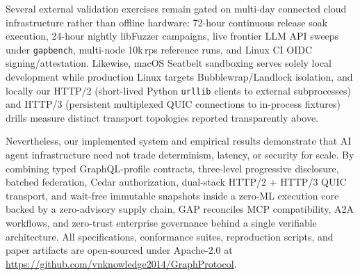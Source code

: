 \documentclass[10pt,twocolumn]{article}
\begin{document}
Several external validation exercises remain gated on multi-day connected cloud infrastructure rather than offline hardware: 72-hour continuous release soak execution, 24-hour nightly libFuzzer campaigns, live frontier LLM API sweeps under \texttt{gapbench}, multi-node 10k\,rps reference runs, and Linux CI OIDC signing/attestation. Likewise, macOS Seatbelt sandboxing serves solely local development while production Linux targets Bubblewrap/Landlock isolation, and locally our HTTP/2 (short-lived Python \texttt{urllib} clients to external subprocesses) and HTTP/3 (persistent multiplexed QUIC connections to in-process fixtures) drills measure distinct transport topologies reported transparently above.

Nevertheless, our implemented system and empirical results demonstrate that AI agent infrastructure need not trade determinism, latency, or security for scale. By combining typed GraphQL-profile contracts, three-level progressive disclosure, batched federation, Cedar authorization, dual-stack HTTP/2 + HTTP/3 QUIC transport, and wait-free immutable snapshots inside a zero-ML execution core backed by a zero-advisory supply chain, GAP reconciles MCP compatibility, A2A workflows, and zero-trust enterprise governance behind a single verifiable architecture. All specifications, conformance suites, reproduction scripts, and paper artifacts are open-sourced under Apache-2.0 at \url{https://github.com/vnknowledge2014/GraphProtocol}.
\end{document}
